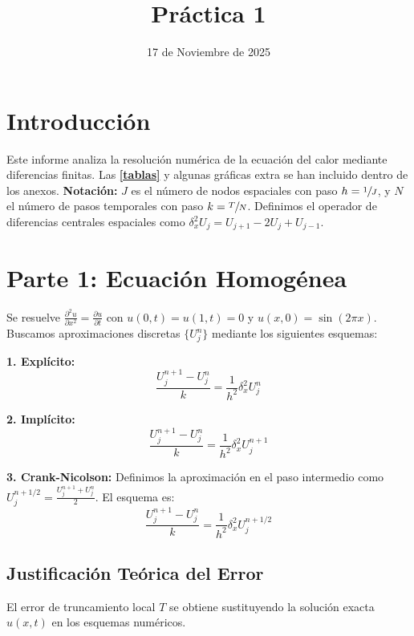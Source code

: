 \documentclass{article}
\title{Práctica 1}
\author{\IfFileExists{autor.tex}{}{Autor Anónimo}}
\date{17 de Noviembre de 2025}
\begin{document}
\maketitle

\vspace{5cm}

\tableofcontents

\clearpage

\section{Introducción}
Este informe analiza la resolución numérica de la ecuación del calor mediante diferencias finitas.
Las \hyperlink{tablas}{\textbf{[tablas]}} y algunas gráficas extra se han incluido dentro de los anexos.
\noindent \textbf{Notación:} \(J\) es el número de nodos espaciales con paso \(h = \sfrac{1}{J}\), y \(N\) el número de pasos temporales con paso \(k = \sfrac{T}{N}\). Definimos el operador de diferencias centrales espaciales como \(\delta_x^2 U_j = U_{j+1} - 2U_j + U_{j-1}\).

\section{Parte 1: Ecuación Homogénea}
Se resuelve \(\frac{\partial^2 u}{\partial x^2} = \frac{\partial u}{\partial t}\) con \(u(0,t)=u(1,t)=0\) y \(u(x,0) = \sin(2 \pi x)\).
Buscamos aproximaciones discretas \(\{U_{j}^n\}\) mediante los siguientes esquemas:

\noindent
\begin{minipage}[t]{0.48\textwidth}
	\textbf{1. Explícito:}
	\[ \frac{U_{j}^{n+1} - U_j^{n}}{k} = \frac{1}{h^2} \delta_x^2 U_j^n \]
\end{minipage}\hfill
\begin{minipage}[t]{0.48\textwidth}
	\textbf{2. Implícito:}
	\[ \frac{U_{j}^{n+1} - U_j^{n}}{k} = \frac{1}{h^2} \delta_x^2 U_j^{n+1} \]
\end{minipage}

\vspace{0.2cm}
\noindent \textbf{3. Crank-Nicolson:}
Definimos la aproximación en el paso intermedio como \( U_j^{n+1/2} = \frac{U_j^{n+1} + U_j^n}{2} \). El esquema es:
\[ \frac{U_{j}^{n+1} - U_j^{n}}{k} = \frac{1}{h^2} \delta_x^2 U_j^{n+1/2} \]

\subsection{Justificación Teórica del Error}
El error de truncamiento local \(T\) se obtiene sustituyendo la solución exacta \(u(x,t)\) en los esquemas numéricos.
\end{document}
